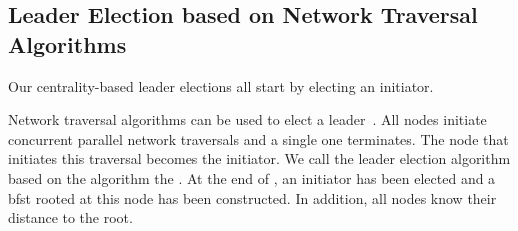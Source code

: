 %	
%	
%				



\subsection{Leader Election based on Network Traversal Algorithms}
\label{section:centrality:id-leader-election}

Our centrality-based leader elections all start by electing an initiator.

Network traversal algorithms can be used to elect a leader~\cite{raynal2013distributed}. All nodes initiate concurrent parallel network traversals and a single one terminates. The node that initiates this traversal becomes the initiator. We call the leader election algorithm based on the \cheung{} algorithm the \cheungIe{}. At the end of \mbox{\cheungIe{}}, an initiator has been elected and a \gls{bfst} rooted at this node has been constructed. In addition, all nodes know their distance to the root.

